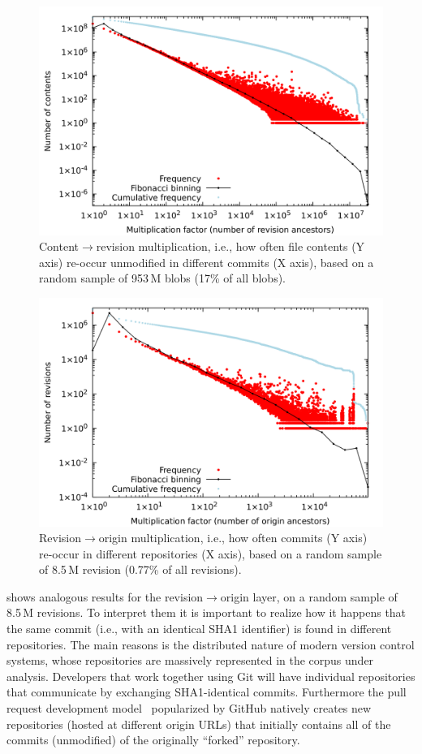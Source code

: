 \smallskip

\begin{figure}
  \centering
  \includegraphics[width=0.7\linewidth]{img/compression/distributions/contents.png}
  \caption{Content$\to$revision multiplication, i.e., how often file contents
    (Y axis) re-occur unmodified in different commits (X axis), based on a
    random sample of 953\,M blobs (17\% of all blobs).}%
  \label{fig:compression-distrib-cnt-rev}
\end{figure}

\begin{figure}
  \centering
  \includegraphics[width=0.7\linewidth]{img/compression/distributions/revisions.png}
  \caption{Revision$\to$origin multiplication, i.e., how often commits (Y axis)
    re-occur in different repositories (X axis), based on a random sample of
    8.5\,M revision (0.77\% of all revisions).}%
  \label{fig:compression-distrib-rev-ori}
\end{figure}

 shows analogous results for the
revision$\to$origin layer, on a random sample of 8.5\,M revisions. To interpret
them it is important to realize how it happens that the same commit (i.e., with
an identical SHA1 identifier) is found in different repositories. The main
reasons is the distributed nature of modern version control systems, whose
repositories are massively represented in the corpus under analysis. Developers
that work together using Git will have individual repositories that communicate
by exchanging SHA1-identical commits. Furthermore the pull request development
model~\cite{gousios2014pullrequests} popularized by GitHub natively creates new
repositories (hosted at different origin URLs) that initially contains all of
the commits (unmodified) of the originally ``forked'' repository.


